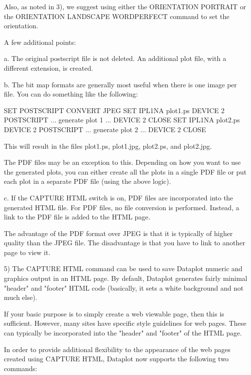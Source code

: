 {    Also, as noted in 3), we suggest using either the ORIENTATION PORTRAIT
    or the ORIENTATION LANDSCAPE WORDPERFECT command to set the
    orientation.

    A few additional points:

    a. The original postscript file is not deleted.  An additional
       plot file, with a different extension, is created.

    b. The bit map formats are generally most useful when there is
       one image per file.  You can do something like the following:

          SET POSTSCRIPT CONVERT JPEG
          SET IPL1NA plot1.ps
          DEVICE 2 POSTSCRIPT
             ...  generate plot 1 ...
          DEVICE 2 CLOSE
          SET IPL1NA plot2.ps
          DEVICE 2 POSTSCRIPT
             ...  generate plot 2 ...
          DEVICE 2 CLOSE

       This will result in the files plot1.ps, plot1.jpg, plot2.ps, and
       plot2.jpg.

       The PDF files may be an exception to this.  Depending on how
       you want to use the generated plots, you can either
       create all the plots in a single PDF file or put each plot
       in a separate PDF file (using the above logic).

    c. If the CAPTURE HTML switch is on, PDF files are incorporated
       into the generated HTML file.  For PDF files, no file
       conversion is performed.  Instead, a link to the PDF file is
       added to the HTML page.

       The advantage of the PDF format over JPEG is that it is typically
       of higher quality than the JPEG file.  The disadvantage is that
       you have to link to another page to view it.

 5) The CAPTURE HTML command can be used to save Dataplot numeric
    and graphics output in an HTML page.  By default, Dataplot
    generates fairly minimal "header" and "footer" HTML code
    (basically, it sets a white background and not much else).

    If your basic purpose is to simply create a web viewable page,
    then this is sufficient.  However, many sites have specific style
    guidelines for web pages.  These can typically be incorporated into
    the "header" and "footer" of the HTML page.

    In order to provide additional flexibility to the appearance
    of the web pages created using CAPTURE HTML, Dataplot now
    supports the following two commands:

}
